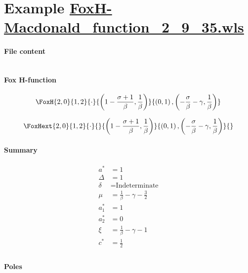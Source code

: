 \documentclass[11pt]{article}
\begin{document}
\section{Example \url{FoxH-Macdonald_function_2_9_35.wls}}

\paragraph{File content}

\inputminted{text}{FoxH-Macdonald_function_2_9_35.wls}

\paragraph{Fox H-function}

\begin{align*}
  \FoxH
    {2,0}
    {1,2}
    {\cdot}
    {\left(1-\frac{\sigma +1}{\beta }, \frac{1}{\beta }\right)}
    {\left(0, 1\right), \left(-\frac{\sigma }{\beta }-\gamma, \frac{1}{\beta }\right)}
\end{align*}

\begin{align*}
  \FoxHext
    {2,0}
    {1,2}
    {\cdot}
    {}
    {\left(1-\frac{\sigma +1}{\beta }, \frac{1}{\beta }\right)}
    {\left(0, 1\right), \left(-\frac{\sigma }{\beta }-\gamma, \frac{1}{\beta }\right)}
    {}
\end{align*}

\paragraph{Summary}

\begin{align*}
  a^*    & = 1 \\
  \Delta & = 1 \\
  \delta & = \text{Indeterminate} \\
  \mu    & = \frac{1}{\beta }-\gamma -\frac{3}{2} \\
  a_1^*  & = 1 \\
  a_2^*  & = 0 \\
  \xi    & = \frac{1}{\beta }-\gamma -1 \\
  c^*    & = \frac{1}{2} \\
\end{align*}

\paragraph{Poles}
\end{document}
